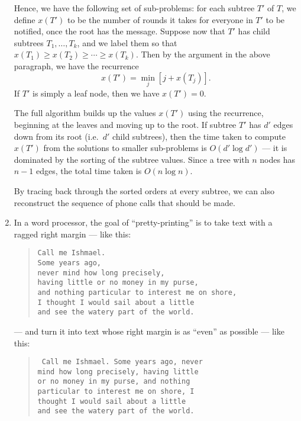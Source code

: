 \documentclass[12pt]{article}
\begin{document}
\begin{enumerate}
{Hence, we have the following set of sub-problems:
for each subtree $T'$ of $T$, we define $x(T')$
to be the number of rounds it takes for everyone
in $T'$ to be notified, once the root has the message.
Suppose now that $T'$ has child subtrees
$T_1, \ldots, T_k$, and we label them so
that $x(T_1) \geq x(T_2) \geq \cdots \geq x(T_k)$.
Then by the argument in the above paragraph,
we have the recurrence
$$x(T') = \min_j \left[ j + x(T_j) \right].$$
If $T'$ is simply a leaf node, then we have $x(T') = 0$.

The full algorithm builds up the values $x(T')$
using the recurrence, beginning at the leaves
and moving up to the root.
If subtree $T'$ has $d'$ edges down from its root
(i.e.~$d'$ child subtrees), then the time taken
to compute $x(T')$ from the solutions to smaller
sub-problems is $O(d' \log d')$ --- it is
dominated by the sorting of the subtree values.
Since a tree with $n$ nodes has $n-1$ edges,
the total time taken is $O(n \log n)$.

By tracing back through the sorted orders
at every subtree, we can also reconstruct
the sequence of phone calls that should be made.

}



\item

 In a word processor, the goal of ``pretty-printing''
is to take text with a ragged right margin --- like this:
\begin{quote}
{\tt Call me Ishmael. \\
Some years ago, \\
never mind how long precisely, \\
having little or no money in my purse, \\
and nothing particular to interest me on shore, \\
I thought I would sail about a little  \\
and see the watery part of the world.}
\end{quote}
--- and turn it into text whose right margin is
as ``even'' as possible --- like this:
\begin{quote}
{\tt
Call me Ishmael. Some years ago, never \\
mind how long precisely, having little \\
or no money in my purse, and nothing \\
particular to interest me on shore, I \\
thought I would sail about a little  \\
and see the watery part of the world.}
\end{quote}


\end{enumerate}
\end{document}
